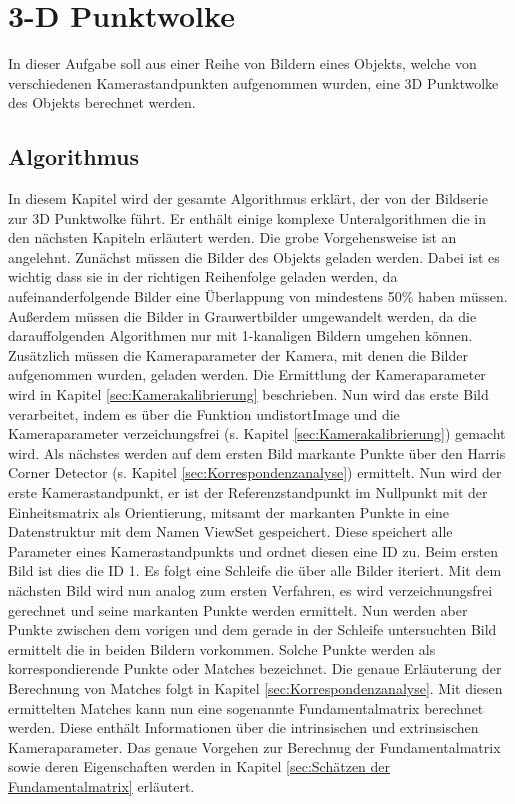 \section{3-D Punktwolke}
\label{3-D Punktwolke}
In dieser Aufgabe soll aus einer Reihe von Bildern eines Objekts, welche von verschiedenen Kamerastandpunkten aufgenommen wurden, eine 3D Punktwolke des Objekts berechnet werden. 

\subsection{Algorithmus}
In diesem Kapitel wird der gesamte Algorithmus erklärt, der von der Bildserie zur 3D Punktwolke führt. Er enthält einige komplexe Unteralgorithmen die in den nächsten Kapiteln erläutert werden. Die grobe Vorgehensweise ist an \cite{Mathworks} angelehnt.
Zunächst müssen die Bilder des Objekts geladen werden. Dabei ist es wichtig dass sie in der richtigen Reihenfolge geladen werden, da aufeinanderfolgende Bilder eine Überlappung von mindestens 50\% haben müssen. Außerdem müssen die Bilder in Grauwertbilder umgewandelt werden, da die darauffolgenden Algorithmen nur mit 1-kanaligen Bildern umgehen können. Zusätzlich müssen die Kameraparameter der Kamera, mit denen die Bilder aufgenommen wurden, geladen werden. Die Ermittlung der Kameraparameter wird in Kapitel \ref{sec:Kamerakalibrierung} beschrieben.
Nun wird das erste Bild verarbeitet, indem es über die Funktion undistortImage und die Kameraparameter verzeichungsfrei (s. Kapitel \ref{sec:Kamerakalibrierung}) gemacht wird.
Als nächstes werden auf dem ersten Bild markante Punkte über den Harris Corner Detector (s. Kapitel \ref{sec:Korrespondenzanalyse}) ermittelt. Nun wird der erste Kamerastandpunkt, er ist der Referenzstandpunkt im Nullpunkt mit der Einheitsmatrix als Orientierung, mitsamt der markanten Punkte in eine Datenstruktur mit dem Namen ViewSet gespeichert. Diese speichert alle Parameter eines Kamerastandpunkts und ordnet diesen eine ID zu. Beim ersten Bild ist dies die ID 1.
Es folgt eine Schleife die über alle Bilder iteriert. Mit dem nächsten Bild wird nun analog zum ersten Verfahren, es wird verzeichnungsfrei gerechnet und seine markanten Punkte werden ermittelt. Nun werden aber Punkte zwischen dem vorigen und dem gerade in der Schleife untersuchten Bild ermittelt die in beiden Bildern vorkommen. Solche Punkte werden als korrespondierende Punkte oder Matches bezeichnet. Die genaue Erläuterung der Berechnung von Matches folgt in Kapitel \ref{sec:Korrespondenzanalyse}.
Mit diesen ermittelten Matches kann nun eine sogenannte Fundamentalmatrix berechnet werden. Diese enthält Informationen über die intrinsischen und extrinsischen Kameraparameter. Das genaue Vorgehen zur Berechnug der Fundamentalmatrix sowie deren Eigenschaften werden in Kapitel \ref{sec:Schätzen der Fundamentalmatrix} erläutert. 
